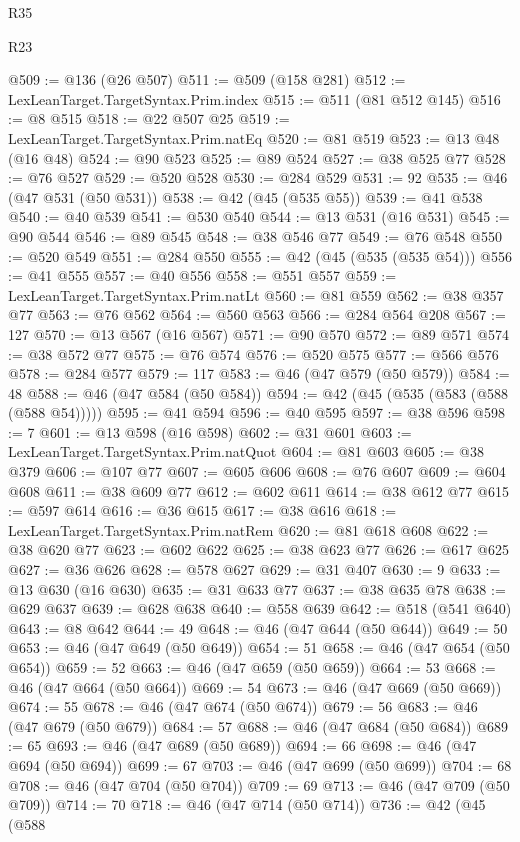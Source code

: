 \begin{lexlean}{R35}
\begin{lexlean}{R23}
\begin{coremodule}
{{{{{{{{{{{{{{{{{{{{{@509 := @136 (@26 @507)
@511 := @509 (@158 @281)
@512 := LexLeanTarget.TargetSyntax.Prim.index
@515 := @511 (@81 @512 @145)
@516 := @8 @515
@518 := @22 @507 @25
@519 := LexLeanTarget.TargetSyntax.Prim.natEq
@520 := @81 @519
@523 := @13 @48 (@16 @48)
@524 := @90 @523
@525 := @89 @524
@527 := @38 @525 @77
@528 := @76 @527
@529 := @520 @528
@530 := @284 @529
@531 := 92
@535 := @46 (@47 @531 (@50 @531))
@538 := @42 (@45 (@535 @55))
@539 := @41 @538
@540 := @40 @539
@541 := @530 @540
@544 := @13 @531 (@16 @531)
@545 := @90 @544
@546 := @89 @545
@548 := @38 @546 @77
@549 := @76 @548
@550 := @520 @549
@551 := @284 @550
@555 := @42 (@45 (@535 (@535 @54)))
@556 := @41 @555
@557 := @40 @556
@558 := @551 @557
@559 := LexLeanTarget.TargetSyntax.Prim.natLt
@560 := @81 @559
@562 := @38 @357 @77
@563 := @76 @562
@564 := @560 @563
@566 := @284 @564 @208
@567 := 127
@570 := @13 @567 (@16 @567)
@571 := @90 @570
@572 := @89 @571
@574 := @38 @572 @77
@575 := @76 @574
@576 := @520 @575
@577 := @566 @576
@578 := @284 @577
@579 := 117
@583 := @46 (@47 @579 (@50 @579))
@584 := 48
@588 := @46 (@47 @584 (@50 @584))
@594 := @42 (@45 (@535 (@583 (@588 (@588 @54)))))
@595 := @41 @594
@596 := @40 @595
@597 := @38 @596
@598 := 7
@601 := @13 @598 (@16 @598)
@602 := @31 @601
@603 := LexLeanTarget.TargetSyntax.Prim.natQuot
@604 := @81 @603
@605 := @38 @379
@606 := @107 @77
@607 := @605 @606
@608 := @76 @607
@609 := @604 @608
@611 := @38 @609 @77
@612 := @602 @611
@614 := @38 @612 @77
@615 := @597 @614
@616 := @36 @615
@617 := @38 @616
@618 := LexLeanTarget.TargetSyntax.Prim.natRem
@620 := @81 @618 @608
@622 := @38 @620 @77
@623 := @602 @622
@625 := @38 @623 @77
@626 := @617 @625
@627 := @36 @626
@628 := @578 @627
@629 := @31 @407
@630 := 9
@633 := @13 @630 (@16 @630)
@635 := @31 @633 @77
@637 := @38 @635 @78
@638 := @629 @637
@639 := @628 @638
@640 := @558 @639
@642 := @518 (@541 @640)
@643 := @8 @642
@644 := 49
@648 := @46 (@47 @644 (@50 @644))
@649 := 50
@653 := @46 (@47 @649 (@50 @649))
@654 := 51
@658 := @46 (@47 @654 (@50 @654))
@659 := 52
@663 := @46 (@47 @659 (@50 @659))
@664 := 53
@668 := @46 (@47 @664 (@50 @664))
@669 := 54
@673 := @46 (@47 @669 (@50 @669))
@674 := 55
@678 := @46 (@47 @674 (@50 @674))
@679 := 56
@683 := @46 (@47 @679 (@50 @679))
@684 := 57
@688 := @46 (@47 @684 (@50 @684))
@689 := 65
@693 := @46 (@47 @689 (@50 @689))
@694 := 66
@698 := @46 (@47 @694 (@50 @694))
@699 := 67
@703 := @46 (@47 @699 (@50 @699))
@704 := 68
@708 := @46 (@47 @704 (@50 @704))
@709 := 69
@713 := @46 (@47 @709 (@50 @709))
@714 := 70
@718 := @46 (@47 @714 (@50 @714))
@736 := @42
    (@45
      (@588
}}}}}}}}}}}}}}}}}}}}}
\end{coremodule}
\end{lexlean}
\end{lexlean}
